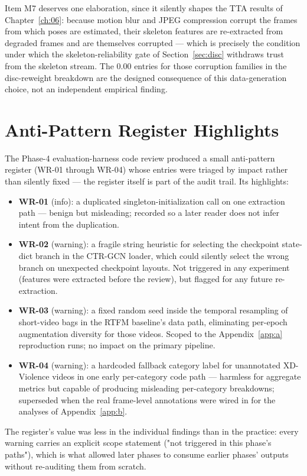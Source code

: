 Item M7 deserves one elaboration, since it silently shapes the TTA results of
Chapter~\ref{ch:06}: because motion blur and JPEG compression corrupt the
frames from which poses are estimated, their skeleton features are re-extracted
from degraded frames and are themselves corrupted --- which is precisely the
condition under which the skeleton-reliability gate of Section~\ref{sec:disc}
withdraws trust from the skeleton stream. The 0.00 entries for those
corruption families in the disc-reweight breakdown are the designed
consequence of this data-generation choice, not an independent empirical
finding.

\section{Anti-Pattern Register Highlights}
\label{sec:appd-antipatterns}

The Phase-4 evaluation-harness code review produced a small anti-pattern
register (WR-01 through WR-04) whose entries were triaged by impact rather
than silently fixed --- the register itself is part of the audit trail. Its
highlights:

\begin{itemize}
    \item \textbf{WR-01} (info): a duplicated singleton-initialization call on
    one extraction path --- benign but misleading; recorded so a later reader
    does not infer intent from the duplication.
    \item \textbf{WR-02} (warning): a fragile string heuristic for selecting
    the checkpoint state-dict branch in the CTR-GCN loader, which could
    silently select the wrong branch on unexpected checkpoint layouts. Not
    triggered in any experiment (features were extracted before the review),
    but flagged for any future re-extraction.
    \item \textbf{WR-03} (warning): a fixed random seed inside the temporal
    resampling of short-video bags in the RTFM baseline's data path,
    eliminating per-epoch augmentation diversity for those videos. Scoped to
    the Appendix~\ref{app:a} reproduction runs; no impact on the primary
    pipeline.
    \item \textbf{WR-04} (warning): a hardcoded fallback category label for
    unannotated XD-Violence videos in one early per-category code path ---
    harmless for aggregate metrics but capable of producing misleading
    per-category breakdowns; superseded when the real frame-level annotations
    were wired in for the analyses of Appendix~\ref{app:b}.
\end{itemize}

The register's value was less in the individual findings than in the practice:
every warning carries an explicit scope statement ("not triggered in this
phase's paths"), which is what allowed later phases to consume earlier
phases' outputs without re-auditing them from scratch.
